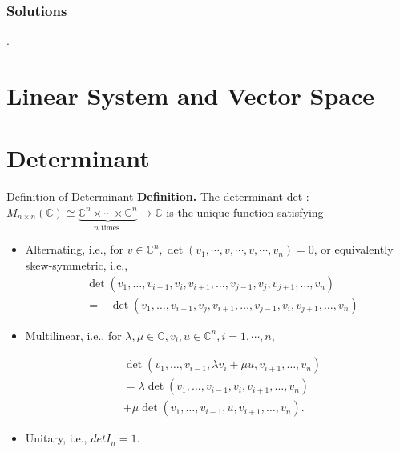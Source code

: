 \documentclass{beamer}
\begin{document}
\begin{frame}
    \frametitle{Solutions}.
\end{frame}

\section{Linear System and Vector Space}


\section{Determinant}
\begin{frame}[label=3]{Definition of Determinant}
\textbf{Definition.} The determinant det : $M_{n \times n}(\mathbb{C}) \cong \underbrace{\mathbb{C}^{n} \times \cdots \times \mathbb{C}^{n}}_{n \text { times }} \rightarrow \mathbb{C}$ is the unique function satisfying
\begin{itemize}
    \item Alternating, i.e., for $v \in \mathbb{C}^{n}, \operatorname{det}\left(v_{1}, \cdots, v, \cdots, v, \cdots, v_{n}\right)=0$, or equivalently  skew-symmetric, i.e.,
    $$
\begin{aligned}
& \operatorname{det}\left(v_{1}, \ldots, v_{i-1}, v_{i}, v_{i+1}, \ldots, v_{j-1}, v_{j}, v_{j+1}, \ldots, v_{n}\right) \\
& =-\operatorname{det}\left(v_{1}, \ldots, v_{i-1}, v_{j}, v_{i+1}, \ldots, v_{j-1}, v_{i}, v_{j+1}, \ldots, v_{n}\right)
\end{aligned}
$$

\item Multilinear, i.e., for $\lambda, \mu \in \mathbb{C}, v_{i}, u \in \mathbb{C}^{n}, i=1, \cdots, n$,

$$
\begin{aligned}
& \operatorname{det}\left(v_{1}, \ldots, v_{i-1}, \lambda v_{i}+\mu u, v_{i+1}, \ldots, v_{n}\right) \\
& =\lambda \operatorname{det}\left(v_{1}, \ldots, v_{i-1}, v_{i}, v_{i+1}, \ldots, v_{n}\right) \\
& +\mu \operatorname{det}\left(v_{1}, \ldots, v_{i-1}, u, v_{i+1}, \ldots, v_{n}\right) .
\end{aligned}
$$
\item Unitary, i.e., $det I_n = 1.$
\end{itemize}

\end{frame}
\end{document}
